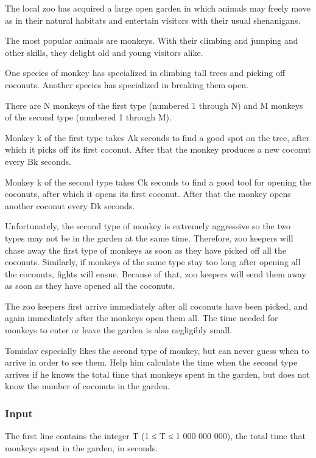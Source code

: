 



   The local zoo has acquired a large open garden in which animals may freely move as in their natural habitats and entertain visitors with their usual shenanigans.  

   The most popular animals are monkeys. With their climbing and jumping and other skills, they delight old and young visitors alike.  

   One species of monkey has specialized in climbing tall trees and picking off coconuts. Another species has specialized in breaking them open.  

   There are N monkeys of the first type (numbered 1 through N) and M monkeys of the second type (numbered 1 through M).  

   Monkey k of the first type takes Ak seconds to find a good spot on the tree, after which it picks off its first coconut. After that the monkey produces a new coconut every Bk seconds.  

   Monkey k of the second type takes Ck seconds to find a good tool for opening the coconuts, after which it opens its first coconut. After that the monkey opens another coconut every Dk seconds.  

   Unfortunately, the second type of monkey is extremely aggressive so the two types may not be in the garden at the same time. Therefore, zoo keepers will chase away the first type of monkeys as soon as they have picked off all the coconuts. Similarly, if monkeys of the same type stay too long after opening all the coconuts, fights will ensue. Because of that, zoo keepers will send them away as soon as they have opened all the coconuts.  

   The zoo keepers first arrive immediately after all coconuts have been picked, and again immediately after the monkeys open them all. The time needed for monkeys to enter or leave the garden is also negligibly small.  

   Tomislav especially likes the second type of monkey, but can never guess when to arrive in order to see them. Help him calculate the time when the second type arrives if he knows the total time that monkeys spent in the garden, but does not know the number of coconuts in the garden.  

\subsubsection{   Input  }

   The first line contains the integer T (1 ≤ T ≤ 1 000 000 000), the total time that monkeys spent in the garden, in seconds.  

